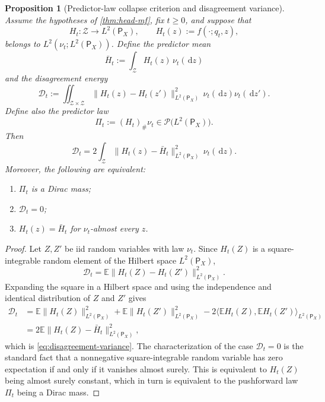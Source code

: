 \documentclass{article}
\newtheorem{proposition}[theorem]{Proposition}
\theoremstyle{definition}
\newcommand{\E}{\mathbb{E}}
\newcommand{\PP}{\mathcal{P}}
\newcommand{\dd}{\,\mathrm{d}}
\begin{document}
\begin{proposition}[Predictor-law collapse criterion and disagreement variance]
\label{prop:disagreement}
Assume the hypotheses of \cref{thm:head-mf}, fix $t\ge 0$, and suppose that
\[
  H_t:\mathcal Z\to L^2(\mathsf P_X),
  \qquad
  H_t(z):=f(\cdot;q_t,z),
\]
belongs to $L^2(\nu_t;L^2(\mathsf P_X))$. Define the predictor mean
\[
  \bar H_t := \int_{\mathcal Z} H_t(z)\,\nu_t(\dd z)
\]
and the disagreement energy
\[
  \mathcal D_t
  :=
  \iint_{\mathcal Z\times\mathcal Z}
  \|H_t(z)-H_t(z')\|_{L^2(\mathsf P_X)}^2\,
  \nu_t(\dd z)\nu_t(\dd z').
\]
Define also the predictor law
\[
  \Pi_t := (H_t)_\# \nu_t \in \PP\bigl(L^2(\mathsf P_X)\bigr).
\]
Then
\begin{equation}
  \mathcal D_t
  =
  2\int_{\mathcal Z}
  \|H_t(z)-\bar H_t\|_{L^2(\mathsf P_X)}^2\,
  \nu_t(\dd z).
  \label{eq:disagreement-variance}
\end{equation}
Moreover, the following are equivalent:
\begin{enumerate}[leftmargin=2em]
  \item $\Pi_t$ is a Dirac mass;
  \item $\mathcal D_t=0$;
  \item $H_t(z)=\bar H_t$ for $\nu_t$-almost every $z$.
\end{enumerate}
\end{proposition}

\begin{proof}
Let $Z,Z'$ be iid random variables with law $\nu_t$. Since $H_t(Z)$ is a
square-integrable random element of the Hilbert space $L^2(\mathsf P_X)$,
\[
  \mathcal D_t
  =
  \E\|H_t(Z)-H_t(Z')\|_{L^2(\mathsf P_X)}^2.
\]
Expanding the square in a Hilbert space and using the independence and identical
distribution of $Z$ and $Z'$ gives
\begin{align*}
  \mathcal D_t
  &=
  \E\|H_t(Z)\|_{L^2(\mathsf P_X)}^2
  +
  \E\|H_t(Z')\|_{L^2(\mathsf P_X)}^2
  -
  2\bigl\langle \E H_t(Z), \E H_t(Z') \bigr\rangle_{L^2(\mathsf P_X)}
  \\
  &=
  2\E\|H_t(Z)-\bar H_t\|_{L^2(\mathsf P_X)}^2,
\end{align*}
which is \eqref{eq:disagreement-variance}. The characterization of the case
$\mathcal D_t=0$ is the standard fact that a nonnegative square-integrable
random variable has zero expectation if and only if it vanishes almost surely.
This is equivalent to $H_t(Z)$ being almost surely constant, which in turn is
equivalent to the pushforward law $\Pi_t$ being a Dirac mass.
\end{proof}
\end{document}
